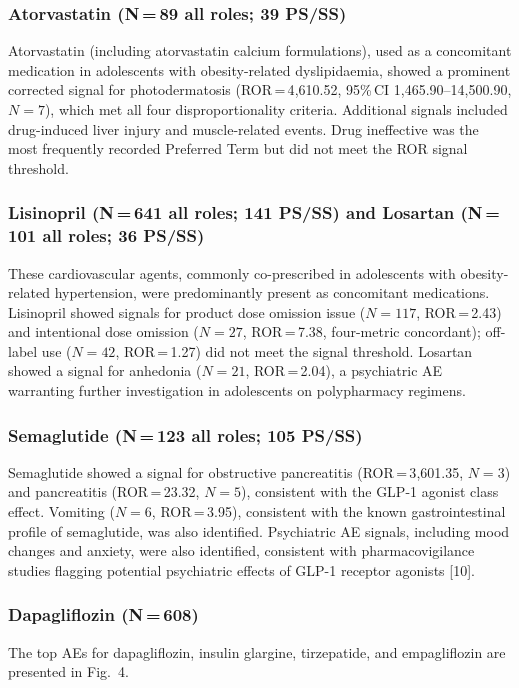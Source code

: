 \documentclass[10pt,a4paper]{article}
\begin{document}
\subsubsection{Atorvastatin (N\,=\,89 all roles; 39 PS/SS)}
Atorvastatin (including atorvastatin calcium formulations), used as a concomitant medication in adolescents with obesity-related dyslipidaemia, showed a prominent corrected signal for photodermatosis (ROR\,=\,4{,}610.52, 95\%\,CI 1{,}465.90--14{,}500.90, $N=7$), which met all four disproportionality criteria. Additional signals included drug-induced liver injury and muscle-related events. Drug ineffective was the most frequently recorded Preferred Term but did not meet the ROR signal 
threshold.

\subsubsection{Lisinopril (N\,=\,641 all roles; 141 PS/SS) and Losartan (N\,=\,101 all roles; 36 PS/SS)}
These cardiovascular agents, commonly co-prescribed in adolescents with obesity-related hypertension, were predominantly present as concomitant medications. Lisinopril showed signals for product dose omission issue ($N=117$, ROR\,=\,2.43) and intentional dose omission ($N=27$, ROR\,=\,7.38, four-metric concordant); off-label use ($N=42$, ROR\,=\,1.27) did not meet the signal threshold. Losartan showed a signal for anhedonia ($N=21$, ROR\,=\,2.04), a psychiatric AE warranting further investigation in adolescents on polypharmacy regimens.

\subsubsection{Semaglutide (N\,=\,123 all roles; 105 PS/SS)}
Semaglutide showed a signal for obstructive pancreatitis (ROR\,=\,3{,}601.35, $N=3$) and pancreatitis (ROR\,=\,23.32, $N=5$), consistent with the GLP-1 agonist class effect. Vomiting ($N=6$, ROR\,=\,3.95), consistent with the known gastrointestinal profile of semaglutide, was also identified. Psychiatric AE signals, including mood changes and anxiety, were also identified, 
consistent with pharmacovigilance studies flagging potential psychiatric effects of GLP-1 receptor agonists 
[10].

\subsubsection{Dapagliflozin (N\,=\,608)}
The top AEs for dapagliflozin, insulin glargine, tirzepatide, and empagliflozin are presented in Fig.~4.
\end{document}
